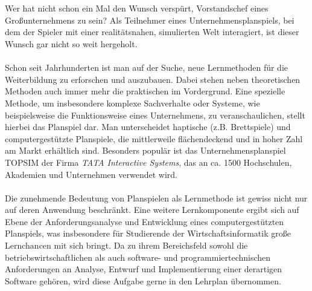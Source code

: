 
\\
\\
Wer hat nicht schon ein Mal den Wunsch verspürt, Vorstandschef eines Großunternehmens zu sein? 
Als Teilnehmer eines Unternehmensplanspiels, bei dem der Spieler mit  einer realitätsnahen, simulierten Welt interagiert, ist dieser Wunsch gar nicht so weit hergeholt. 
\\
\\
Schon seit Jahrhunderten ist man auf der Suche, neue Lernmethoden für die Weiterbildung zu erforschen und auszubauen. Dabei stehen neben theoretischen Methoden auch immer mehr die praktischen im Vordergrund.  Eine spezielle Methode, um insbesondere komplexe Sachverhalte oder Systeme, wie beispielsweise die Funktionsweise eines Unternehmens, zu veranschaulichen, stellt hierbei das Planspiel dar. Man unterscheidet haptische (z.B. Brettspiele) und computergestützte Planspiele, die mittlerweile flächendeckend und in hoher Zahl am Markt erhältlich sind. Besonders populär ist das Unternehmensplanspiel TOPSIM der Firma \textit{TATA Interactive Systems}, das an ca. 1500 Hochschulen, Akademien und Unternehmen verwendet wird.
\\
\\
Die zunehmende Bedeutung von Planspielen als Lernmethode ist gewiss nicht nur auf deren Anwendung beschränkt. Eine weitere Lernkomponente ergibt sich auf Ebene der Anforderungsanalyse und Entwicklung eines computergestützten Planspiels, was insbesondere für Studierende der Wirtschaftsinformatik große Lernchancen mit sich bringt. Da zu ihrem Bereichsfeld sowohl die betriebswirtschaftlichen als auch software- und programmiertechnischen Anforderungen an Analyse, Entwurf und Implementierung einer derartigen Software gehören, wird diese Aufgabe gerne in den Lehrplan übernommen. 

\autorende{}

